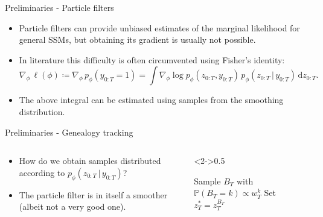\documentclass[10pt, aspectratio=1610]{beamer}
\newcommand{\given}{\,|\,}
\newcommand{\dd}{\mathrm{d}}
\begin{document}
    \begin{frame}{Preliminaries - Particle filters}
      \begin{itemize}
        \item Particle filters can provide unbiased estimates of the marginal likelihood for general SSMs, but obtaining its gradient is usually not possible.
        \item In literature this difficulty is often circumvented using Fisher's identity:
          \begin{equation}
            \nabla_\phi \, \ell(\phi) \coloneq \nabla_\phi \, p_\phi(y_{0:T} = 1) = \int \nabla_\phi \log p_{\phi}(z_{0:T}, y_{0:T}) \, p_\phi(z_{0:T} \given y_{0:T}) \, \dd z_{0:T}.
          \end{equation}
        \item The above integral can be estimated using samples from the smoothing distribution.
      \end{itemize} 
    \end{frame}

    \begin{frame}{Preliminaries - Genealogy tracking}
      \begin{columns}
        \begin{column}{0.5\textwidth}
          \begin{itemize}
            \item<1-> How do we obtain samples distributed according to $p_\phi(z_{0:T} \given y_{0:T})$?
            \item<2-> The particle filter is in itself a smoother (albeit not a very good one).
          \end{itemize}          
        \end{column}
        \begin{column}<2->{0.5\textwidth}
          \begin{algorithm*}[H]
            \SetAlgoLined
            \LinesNumbered
            \DontPrintSemicolon
            Sample $B_T$ with $\mathbb{P}(B_T = k) \propto w_T^k$ \; 
            Set $z_T^* = z_T^{B_T}$ \;
            \caption{Genealogy tracking.}
          \end{algorithm*}
        \end{column}
      \end{columns}
    \end{frame}
\end{document}
